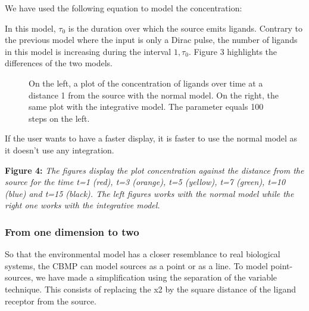\documentclass[11.5pt]{article}
\begin{document}
We have used the following equation to model the concentration: 

\begin{figure}[H]
\centering
\end{figure}

In this model, \(\tau_0\) is the duration over which the 
source emits ligands. Contrary to the previous model where the input is 
only a Dirac pulse, the number of ligands in this model is increasing 
during the interval \(1,\tau_0\). Figure 3 
highlights the differences of the two models.

\begin{figure}[H]
\centering
\caption{On the left, a plot of the 
concentration of ligands over time at a distance 1 from the source with 
the normal model. On the right, the same plot with the integrative 
model. The parameter equals 100 steps on the left. }
\end{figure}

If the user wants to have a faster display, it is faster to use the 
normal model as it doesn't use any integration. 

\begin{figure}[H]
\centering
\end{figure}
\begin{figure}[H]
\centering
\end{figure}




{\bfseries Figure 4:} {\itshape The figures display the plot concentration 
against the distance from the source for the time t=1 (red), t=3 
(orange), t=5 (yellow), t=7 (green), t=10 (blue) and t=15 (black). The 
left figures works with the normal model while the right one works with 
the integrative model. } 



\subsubsection{From one dimension to two}
So that the environmental model has a closer resemblance to real 
biological systems, the CBMP can model sources as a point or as a line. 
To model point-sources, we have made a simplification using the 
separation of the variable technique. This consists of replacing the x2 
by the square distance of the ligand receptor from the source.
\end{document}
